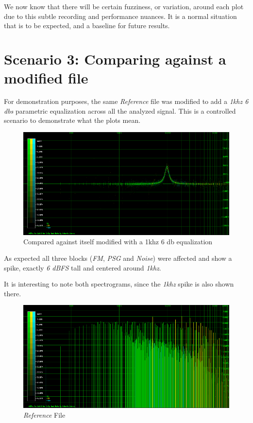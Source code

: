 \documentclass[10pt,a4paper]{report}
\begin{document}
We now know that there will be certain fuzziness, or variation, around each plot due to this subtle recording and performance nuances. It is a normal situation that is to be expected, and a baseline for future results.

\section{Scenario 3: Comparing against a modified file}

For demonstration purposes, the same \textit{Reference} file was modified to add a \textit{1khz 6 dbs} parametric equalization across all the analyzed signal. This is a controlled scenario to demonstrate what the plots mean.

\begin{figure}[H]
	\centering
	\includegraphics[width=1.0\linewidth]{plots/Plot3-Modified.png}
	\caption[1khz modified]{Compared against itself modified with a 1khz 6 db equalization}
	\label{fig:plot3-modified}
\end{figure}

As expected all three blocks (\textit{FM}, \textit{PSG} and \textit{Noise}) were affected and show a spike, exactly \textit{6 dBFS} tall and centered around \textit{1khz}.

It is interesting to note both spectrograms, since the \textit{1khz} spike is also shown there.

\begin{figure}[H]
	\centering
	\includegraphics[width=1.0\linewidth]{plots/Plot3-Spectrogram.png}
	\caption[Reference File]{\textit{Reference} File}
	\label{fig:plot3-spectrogram}
\end{figure}
\end{document}
